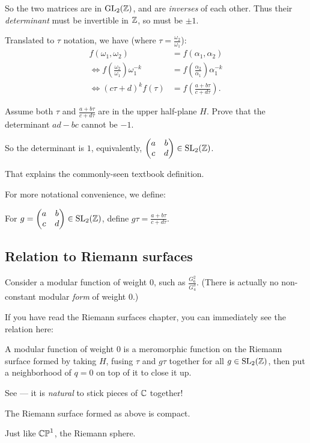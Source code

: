So the two matrices are in $\operatorname{GL}_2(\mathbb Z)$, and are \emph{inverses} of each other.
Thus their \emph{determinant} must be invertible in $\mathbb Z$, so must be $\pm 1$.

Translated to $\tau$ notation, we have (where $\tau = \frac{\omega_2}{\omega_1}$):
\begin{align*}
	f(\omega_1, \omega_2) &= f(\alpha_1, \alpha_2) \\
	\iff f\left(\frac{\omega_2}{\omega_1}\right) \omega_1^{-k}
						  &= f\left(\frac{\alpha_2}{\alpha_1}\right) \alpha_1^{-k} \\
	\iff (c \tau+d)^k f(\tau) &= f\left(\frac{a+b \tau}{c+d \tau}\right).
\end{align*}

\begin{exercise}
	Assume both $\tau$ and $\frac{a+b \tau}{c+d \tau}$ are in the upper half-plane $H$.
	Prove that the determinant $ad-bc$ cannot be $-1$.
\end{exercise}

So the determinant is $1$, equivalently,
$\begin{pmatrix} a&b \\ c&d \end{pmatrix} \in \operatorname{SL}_2(\mathbb Z)$.

That explains the commonly-seen textbook definition.

For more notational convenience, we define:
\begin{definition}
	For $g = \begin{pmatrix} a&b \\ c&d \end{pmatrix} \in \operatorname{SL}_2(\mathbb Z)$,
	define $g \tau = \frac{a+b \tau}{c+d \tau}$.
\end{definition}

\subsection{Relation to Riemann surfaces}

Consider a modular function of weight $0$, such as $\frac{G_6^2}{G_4^3}$.
(There is actually no non-constant modular \emph{form} of weight $0$.)

If you have read the Riemann surfaces chapter, you can immediately see the relation here:
\begin{moral}
	A modular function of weight $0$ is a meromorphic function on the Riemann surface formed by
	taking $H$, fusing $\tau$ and $g \tau$ together for all $g \in \operatorname{SL}_2(\mathbb Z)$,
	then put a neighborhood of $q=0$ on top of it to close it up.
\end{moral}

See --- it is \emph{natural} to stick pieces of $\mathbb C$ together!

\begin{theorem}
	The Riemann surface formed as above is compact.
\end{theorem}

Just like $\mathbb{CP}^1$, the Riemann sphere.

